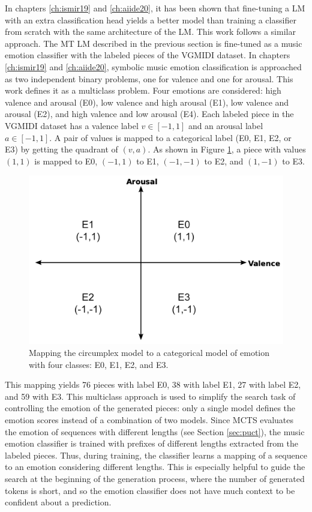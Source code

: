 In chapters \ref{ch:ismir19} and \ref{ch:aiide20}, it has been shown that fine-tuning a LM with an extra classification head yields a better model than training a classifier from scratch with the same architecture of the LM. This work follows a similar approach. The MT LM described in the previous section is fine-tuned as a music emotion classifier with the labeled pieces of the VGMIDI dataset. In chapters \ref{ch:ismir19} and \ref{ch:aiide20}, symbolic music emotion classification is approached as two independent binary problems, one for valence and one for arousal. This work defines it as a multiclass problem. Four emotions are considered: high valence and arousal (E0), low valence and high arousal (E1), low valence and arousal (E2), and high valence and low arousal (E4). Each labeled piece in the VGMIDI dataset has a valence label $v \in [-1, 1]$ and an arousal label $a \in [-1, 1]$. A pair of values is mapped to a categorical label (E0, E1, E2, or E3) by getting the quadrant of $(v,a)$. As shown in Figure \ref{fig:va_mapping}, a piece with values $(1,1)$ is mapped to E0, $(-1,1)$ to E1, $(-1,-1)$ to E2, and $(1, -1)$ to E3.

\begin{figure}
 \centering
 \includegraphics[width=0.7\columnwidth]{imgs/ismir21/circumplex.png}
 \caption{Mapping the circumplex model to a categorical model of emotion with four classes: E0, E1, E2, and E3.}
 \label{fig:va_mapping}
\end{figure}

This mapping yields 76 pieces with label E0, 38 with label E1, 27 with label E2, and 59 with E3. This multiclass approach is used to simplify the search task of controlling the emotion of the generated pieces: only a single model defines the emotion scores instead of a combination of two models. Since MCTS evaluates the emotion of sequences with different lengths (see Section \ref{sec:puct}), the music emotion classifier is trained with prefixes of different lengths extracted from the labeled pieces. Thus, during training, the classifier learns a mapping of a sequence to an emotion considering different lengths. This is especially helpful to guide the search at the beginning of the generation process, where the number of generated tokens is short, and so the emotion classifier does not have much context to be confident about a prediction.

